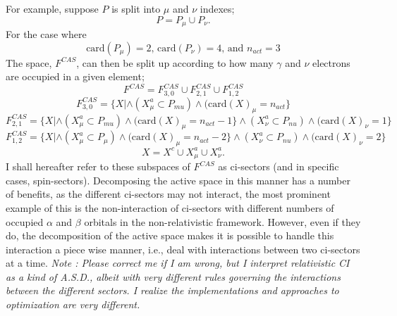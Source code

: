 \documentclass[12pt]{article}
\begin{document}
\noindent  For example, suppose $P$ is split into $\mu$ and $\nu$ indexes;
\begin{equation}
P = P_{\mu} \cup  P_{\nu}.
\end{equation}
For the case where
\begin{equation*}
\text{card}(P_{\mu}) = 2 
\text{, \ \ \ }
\text{card}(P_{\nu}) = 4
\text{, \ \ \ and \ \ \ }
n_{act} = 3
\end{equation*}
The space, $F^{CAS}$, can then be split up according to how many $\gamma$ and $\nu$
electrons are occupied in a given element;
\begin{equation*}
F^{CAS} = F^{CAS}_{3,0} \cup F^{CAS}_{2,1} \cup F^{CAS}_{1,2} 
\end{equation*}
\begin{equation*}
F^{CAS}_{3,0} = \{ X | \wedge (X^{a}_{\mu} \subset P_{mu}) \wedge ( \text{card}(X)_{\mu} = n_{act} \}
\end{equation*}
\begin{equation*}
F^{CAS}_{2,1} = \{ X | \wedge (X^{a}_{\mu} \subset P_{mu}) \wedge ( \text{card}(X)_{\mu} = n_{act}-1 \}
                       \wedge (X^{a}_{\nu} \subset P_{nu}) \wedge ( \text{card}(X)_{\nu} = 1 \}
\end{equation*}
\begin{equation*}
F^{CAS}_{1,2} = \{ X | \wedge (X^{a}_{\mu} \subset P_{\mu}) \wedge ( \text{card}(X)_{\mu} = n_{act}-2 \}
                       \wedge (X^{a}_{\nu} \subset P_{nu}) \wedge ( \text{card}(X)_{\nu} = 2 \}
\end{equation*}
\begin{equation*}
X = X^{c} \cup X^{a}_{\mu} \cup X^{a}_{\nu}.
\end{equation*}
\noindent I shall hereafter refer to these subspaces of $F^{CAS}$ as
ci-sectors (and in specific cases, spin-sectors). Decomposing the active space in
this manner has a number of benefits, as the different ci-sectors may not interact,
the most prominent example of this is the non-interaction
of ci-sectors with different numbers of occupied $\alpha$ and $\beta$ orbitals 
in the non-relativistic framework.  However, even if they do,
the decomposition of the active space makes it is possible to handle
this interaction a piece wise manner, i.e., deal with interactions
between two ci-sectors at a time. \emph{Note : Please correct me if I am wrong,
but I interpret relativistic CI as a kind of A.S.D., albeit with very different rules 
governing the interactions between the different sectors. I realize the implementations
and approaches to optimization are very different.}\\
\end{document}
